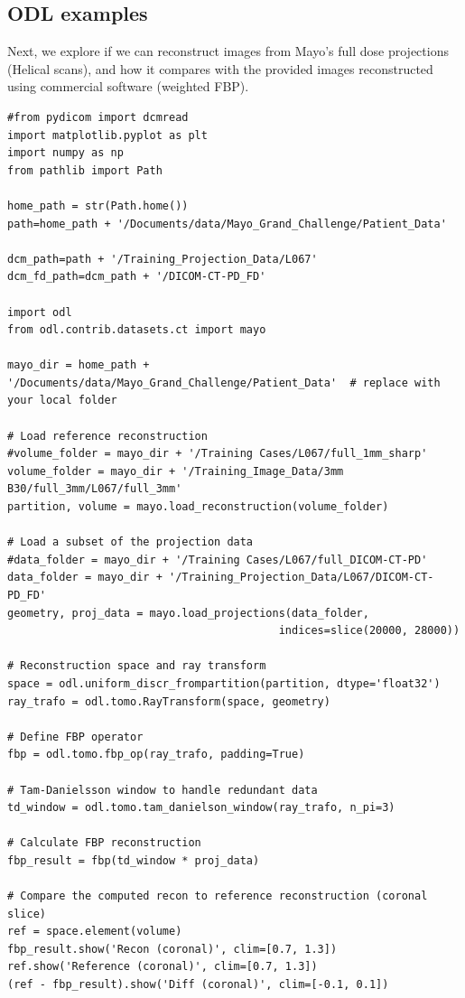 \documentclass[a4paper, 11pt]{article}
\begin{document}
\subsection{ODL examples}
\label{sec:org2836959}
Next, we explore if we can reconstruct images from Mayo's full dose projections (Helical scans), and how it compares with the provided images reconstructed using commercial software (weighted FBP).
\begin{verbatim}
#from pydicom import dcmread
import matplotlib.pyplot as plt
import numpy as np
from pathlib import Path

home_path = str(Path.home())
path=home_path + '/Documents/data/Mayo_Grand_Challenge/Patient_Data'

dcm_path=path + '/Training_Projection_Data/L067'
dcm_fd_path=dcm_path + '/DICOM-CT-PD_FD'

import odl
from odl.contrib.datasets.ct import mayo

mayo_dir = home_path + '/Documents/data/Mayo_Grand_Challenge/Patient_Data'  # replace with your local folder

# Load reference reconstruction
#volume_folder = mayo_dir + '/Training Cases/L067/full_1mm_sharp'
volume_folder = mayo_dir + '/Training_Image_Data/3mm B30/full_3mm/L067/full_3mm'
partition, volume = mayo.load_reconstruction(volume_folder)

# Load a subset of the projection data
#data_folder = mayo_dir + '/Training Cases/L067/full_DICOM-CT-PD'
data_folder = mayo_dir + '/Training_Projection_Data/L067/DICOM-CT-PD_FD'
geometry, proj_data = mayo.load_projections(data_folder,
                                          indices=slice(20000, 28000))

# Reconstruction space and ray transform
space = odl.uniform_discr_frompartition(partition, dtype='float32')
ray_trafo = odl.tomo.RayTransform(space, geometry)

# Define FBP operator
fbp = odl.tomo.fbp_op(ray_trafo, padding=True)

# Tam-Danielsson window to handle redundant data
td_window = odl.tomo.tam_danielson_window(ray_trafo, n_pi=3)

# Calculate FBP reconstruction
fbp_result = fbp(td_window * proj_data)

# Compare the computed recon to reference reconstruction (coronal slice)
ref = space.element(volume)
fbp_result.show('Recon (coronal)', clim=[0.7, 1.3])
ref.show('Reference (coronal)', clim=[0.7, 1.3])
(ref - fbp_result).show('Diff (coronal)', clim=[-0.1, 0.1])


\end{verbatim}
\end{document}
